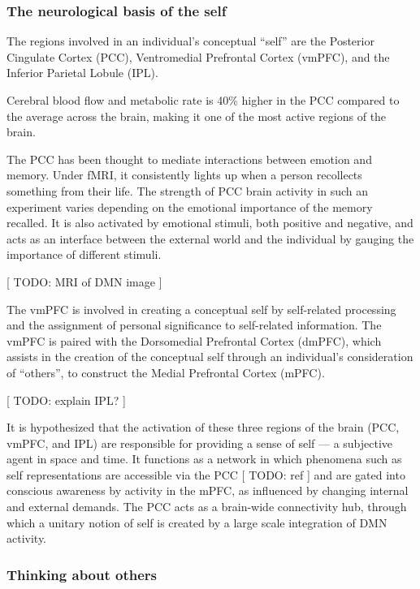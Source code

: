\documentclass[twocolumn]{article}
\begin{document}
\subsubsection{The neurological basis of the self}

The regions involved in an individual's conceptual ``self'' are the Posterior
Cingulate Cortex (PCC), Ventromedial Prefrontal Cortex (vmPFC), and the Inferior
Parietal Lobule (IPL). \cite{defaultnetworkadaptive}

Cerebral blood flow and metabolic rate is 40\%
higher in the PCC compared to the average across the brain, making it one of the most
active regions of the brain. \cite{pccrole}

The PCC has been thought to mediate interactions between emotion and memory. Under
fMRI, it consistently lights up when a person recollects something from their
life. The strength of PCC brain activity in such an experiment varies depending on
the emotional importance of the memory recalled. It is also activated by emotional
stimuli, both positive and negative, and acts as an interface between the external
world and the individual by gauging the importance of different
stimuli. \cite{pccemotion}

[ TODO: MRI of DMN image ] \cite{dmnmri}

The vmPFC is involved in creating a conceptual self by self-related processing
and the assignment of personal significance to self-related
information. \cite{dmnself} The vmPFC is paired with the Dorsomedial Prefrontal
Cortex (dmPFC), which assists in the creation of the conceptual self through an
individual's consideration of ``others'', to construct the Medial Prefrontal Cortex
(mPFC).

[ TODO: explain IPL? ]

It is hypothesized that the activation of these three regions of the brain (PCC,
vmPFC, and IPL) are responsible for providing a sense of self --- a subjective agent
in space and time. It functions as a network in which phenomena such as self
representations are accessible via the PCC [ TODO: ref ] and are gated into conscious awareness by
activity in the mPFC, as influenced by changing internal and external demands. The
PCC acts as a brain-wide connectivity hub, through which a unitary notion of self is
created by a large scale integration of DMN activity. \cite{mappingself}

\subsubsection{Thinking about others}
\end{document}
